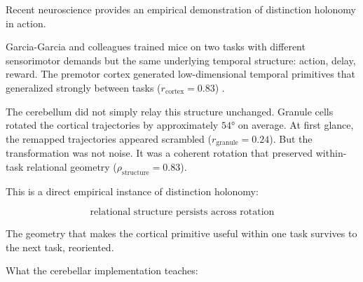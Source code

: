 \documentclass[12pt]{article}
\begin{document}
Recent neuroscience provides an empirical demonstration of distinction holonomy in action.

Garcia-Garcia and colleagues trained mice on two tasks with different sensorimotor demands but the same underlying temporal structure: action, delay, reward. The premotor cortex generated low-dimensional temporal primitives that generalized strongly between tasks ($r_{\text{cortex}} = 0.83$) \cite{garcia2026}.

The cerebellum did not simply relay this structure unchanged. Granule cells rotated the cortical trajectories by approximately $54°$ on average. At first glance, the remapped trajectories appeared scrambled ($r_{\text{granule}} = 0.24$). But the transformation was not noise. It was a coherent rotation that preserved within-task relational geometry ($\rho_{\text{structure}} = 0.83$).

This is a direct empirical instance of distinction holonomy:

\begin{equation}
\text{relational structure persists across rotation}
\end{equation}

The geometry that makes the cortical primitive useful within one task survives to the next task, reoriented.

What the cerebellar implementation teaches:
\end{document}
